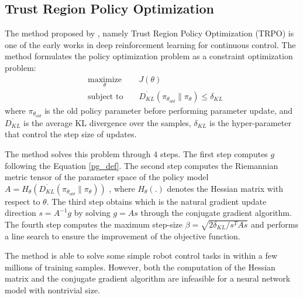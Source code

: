 \subsection{Trust Region Policy Optimization}
The method proposed by \cite{schulman2015trust}, namely Trust Region Policy Optimization (TRPO) is one of the early works in deep reinforcement learning for continuous control. The method formulates the policy optimization problem as a constraint optimization problem:
\begin{equation}
    \begin{aligned}
&    \underset{\theta}{\text{maximize}} 
&& J(\theta) \\
& \text{subject to } 
&& \overline{D_{KL}}(\pi_{\theta_{old}}\|\pi_\theta) \leq \delta_{KL}\label{trpo_obj}\end{aligned}
\end{equation}
where $\pi_{\theta_{old}}$ is the old policy parameter before performing  parameter update, and $\overline{D_{KL}}$ is the average KL divergence over the samples, $\delta_{KL}$ is the hyper-parameter that control the step size of updates.

The method solves this problem through 4 steps. The first step computes $g$ following the Equation \ref{pg_def}. 
The second step computes the Riemannian metric tensor of the parameter space of the policy model $A = H_{\theta}\left(\overline{D_{KL}}(\pi_{\theta_{old}}\|\pi_\theta)\right)$ , where $H_{\theta}(.)$ denotes the Hessian matrix with respect to $\theta$. 
The third step obtains which is the natural gradient update direction $s=A^{-1}g$ by solving $g=As$ through the conjugate gradient algorithm.
The fourth step computes the maximum step-size $\beta= \sqrt{2\delta_{KL}/s^TAs}$ and performs a line search to ensure the improvement of the objective function.

The method is able to solve some simple robot control tasks in \cite{openaigym} within a few millions of training samples. However, both the computation of the Hessian matrix and the conjugate gradient algorithm are infeasible for a neural network model with nontrivial size.

